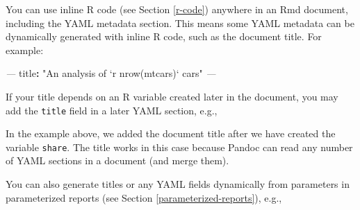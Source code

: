 \documentclass[
  11pt,
]{krantz}
\newenvironment{Shaded}{\begin{snugshade}}{\end{snugshade}}
\newcommand{\AttributeTok}[1]{\textcolor[rgb]{0.61,0.61,0.61}{#1}}
\newcommand{\BaseNTok}[1]{\textcolor[rgb]{0.06,0.06,0.06}{#1}}
\newcommand{\FunctionTok}[1]{\textcolor[rgb]{0,0,0}{#1}}
\newcommand{\KeywordTok}[1]{\textcolor[rgb]{0.27,0.27,0.27}{\textbf{#1}}}
\newcommand{\NormalTok}[1]{#1}
\newcommand{\PreprocessorTok}[1]{\textcolor[rgb]{0.37,0.37,0.37}{\textit{#1}}}
\newcommand{\StringTok}[1]{\textcolor[rgb]{0.5,0.5,0.5}{#1}}
\begin{document}
You can use inline R code (see Section \ref{r-code}) anywhere in an Rmd document, including the YAML metadata section. This means some YAML metadata can be dynamically generated with inline R code, such as the document title. For example:

\begin{Shaded}
\begin{Highlighting}[]
\PreprocessorTok{---}
\FunctionTok{title}\KeywordTok{:}\AttributeTok{ }\StringTok{"An analysis of `r nrow(mtcars)` cars"}
\PreprocessorTok{---}
\end{Highlighting}
\end{Shaded}

If your title depends on an R variable created later in the document, you may add the \texttt{title} field in a later YAML section, e.g.,

\begin{Shaded}
\end{Shaded}

In the example above, we added the document title after we have created the variable \texttt{share}. The title works in this case because Pandoc can read any number of YAML sections in a document (and merge them).

You can also generate titles or any YAML fields dynamically from parameters in parameterized reports (see Section \ref{parameterized-reports}), e.g.,

\begin{Shaded}
\end{Shaded}
\end{document}
